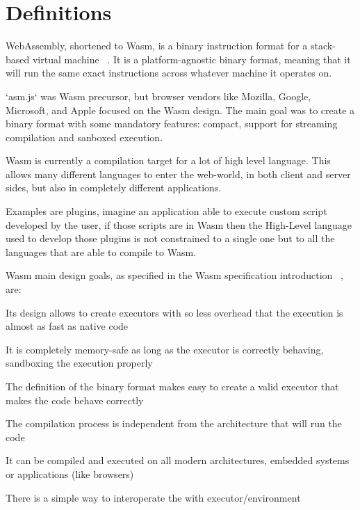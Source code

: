 \section{Definitions}

WebAssembly, shortened to Wasm, is a binary instruction format for a stack-based virtual machine ~\cite{wasm-core-spec}. It is a platform-agnostic binary format, meaning that it will run the same exact instructions across whatever machine it operates on. ~\cite{wasm-polkadot-wiki}

`asm.js` was Wasm precursor, but browser vendors like Mozilla, Google, Microsoft, and Apple focused on the Wasm design. The main goal was to create a binary format with some mandatory features: compact, support for streaming compilation and sanboxed execution.

Wasm is currently a compilation target for a lot of high level language. This allows many different languages to enter the web-world, in both client and server sides, but also in completely different applications.

Examples are plugins, imagine an application able to execute custom script developed by the user, if those scripts are in Wasm then the High-Level language used to develop those plugins is not constrained to a single one but to all the languages that are able to compile to Wasm.

Wasm main design goals, as specified in the Wasm specification introduction ~\cite{wasm-core-spec}, are:
\begin{description}[font=$\bullet$ \scshape\bfseries]
  \item[Fast] Its design allows to create executors with so less overhead that the execution is almost as fast as native code
  \item[Safe] It is completely memory-safe as long as the executor is correctly behaving, sandboxing the execution properly
  \item[Well-defined] The definition of the binary format makes easy to create a valid executor that makes the code behave correctly
  \item[Hardware-independent] The compilation process is independent from the architecture that will run the code
  \item[Platform-independent] It can be compiled and executed on all modern architectures, embedded systems or applications (like browsers)
  \item[Open] There is a simple way to interoperate the with executor/environment
\end{description}


